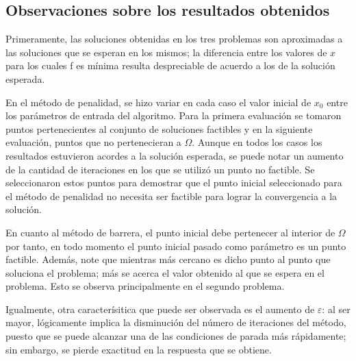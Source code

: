 \documentclass[titlepage, 11pt]{scrartcl}
\begin{document}
	\subsection{Observaciones sobre los resultados obtenidos}
	Primeramente, las soluciones obtenidas en los tres problemas son aproximadas a las soluciones que se esperan en los mismos; la diferencia entre los valores de $x$ para los cuales f es mínima resulta despreciable de acuerdo a los de la solución esperada.
	
	En el método de penalidad, se hizo variar en cada caso el valor inicial de $x_0$ entre los parámetros de entrada del algoritmo. Para la primera evaluación se tomaron puntos pertenecientes al conjunto de soluciones factibles y en la siguiente evaluación, puntos que no pertenecieran a $\Omega$. Aunque en todos los casos los resultados estuvieron acordes a la solución esperada, se puede notar un aumento de la cantidad de iteraciones en los que se utilizó un punto no factible. Se seleccionaron estos puntos para demostrar que el punto inicial seleccionado para el método de penalidad no necesita ser factible para lograr la convergencia a la solución.
	
	En cuanto al método de barrera, el punto inicial debe pertenecer al interior de $\Omega$ por tanto, en todo momento el punto inicial pasado como parámetro es un punto factible. Además, note que mientras más cercano es dicho punto al punto que soluciona el problema; más se acerca el valor obtenido al que se espera en el problema. Esto se observa principalmente en el segundo problema.
	
	Igualmente, otra caracterísitica que puede ser observada es el aumento de $\varepsilon$: al ser mayor, lógicamente implica la disminución del número de iteraciones del método, puesto que se puede alcanzar una de las condiciones de parada más rápidamente; sin embargo, se pierde exactitud en la respuesta que se obtiene.
\end{document}
